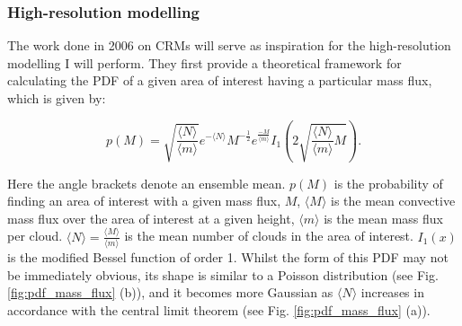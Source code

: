 \documentclass[11pt,a4paper]{article}
\begin{document}
\subsubsection{High-resolution modelling}

The work done in 2006 on CRMs \parencite{craig2006fluctuations, cohen2006fluctuations} will serve as inspiration for the high-resolution modelling I will perform. They first provide a theoretical framework for calculating the PDF of a given area of interest having a particular mass flux, which is given by:

\begin{equation}
    p(M) = \sqrt{\frac{\langle N \rangle}{\langle m \rangle}} e^{-\langle N \rangle} M^{-\frac{1}{2}} e^{\frac{-M}{\langle m \rangle}} I_1\left(2 \sqrt{\frac{\langle N \rangle}{\langle m \rangle} M}\right).
    \label{eqn:pdf_mass_flux}
\end{equation}

Here the angle brackets denote an ensemble mean. $p(M)$ is the probability of finding an area of interest with a given mass flux, $M$, $\langle M \rangle$ is the mean convective mass flux over the area of interest at a given height, $\langle m \rangle$ is the mean mass flux per cloud. $\langle N \rangle = \frac{\langle M \rangle}{\langle m \rangle}$ is the mean number of clouds in the area of interest. $I_1(x)$ is the modified Bessel function of order 1. Whilst the form of this PDF may not be immediately obvious, its shape is similar to a Poisson distribution (see Fig. \ref{fig:pdf_mass_flux} (b)), and it becomes more Gaussian as $\langle N \rangle$ increases in accordance with the central limit theorem (see Fig. \ref{fig:pdf_mass_flux} (a)).
\end{document}
